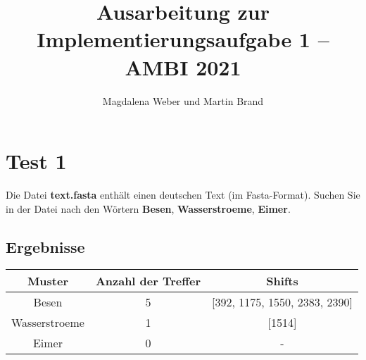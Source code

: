 \documentclass[a4paper,12pt]{article}
\begin{document}
\title{Ausarbeitung zur Implementierungsaufgabe 1 -- AMBI 2021}
\author
{Magdalena Weber und Martin Brand}
\maketitle


\section*{Test 1}
\label{section:aufgabe1}

Die Datei \textbf{text.fasta} enthält einen deutschen Text (im Fasta-Format).
Suchen Sie in der Datei nach den Wörtern \textbf{Besen}, \textbf{Wasserstroeme}, \textbf{Eimer}.

\subsection*{Ergebnisse}
\begin{tabular}{c|c|c}
Muster & Anzahl der Treffer & Shifts \\
\hline
Besen & 5 &  [392, 1175, 1550, 2383, 2390] \\
Wasserstroeme & 1 & [1514] \\
Eimer & 0 & -
\end{tabular}
\end{document}
